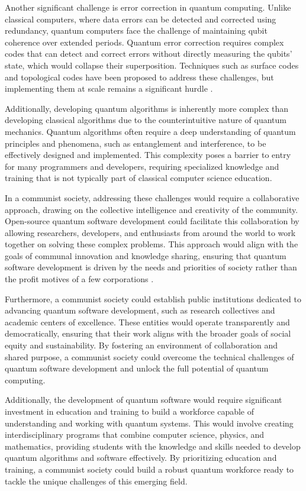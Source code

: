 Another significant challenge is error correction in quantum computing. Unlike classical computers, where data errors can be detected and corrected using redundancy, quantum computers face the challenge of maintaining qubit coherence over extended periods. Quantum error correction requires complex codes that can detect and correct errors without directly measuring the qubits' state, which would collapse their superposition. Techniques such as surface codes and topological codes have been proposed to address these challenges, but implementing them at scale remains a significant hurdle \cite[pp.~032324]{Fowler2012}.

Additionally, developing quantum algorithms is inherently more complex than developing classical algorithms due to the counterintuitive nature of quantum mechanics. Quantum algorithms often require a deep understanding of quantum principles and phenomena, such as entanglement and interference, to be effectively designed and implemented. This complexity poses a barrier to entry for many programmers and developers, requiring specialized knowledge and training that is not typically part of classical computer science education.

In a communist society, addressing these challenges would require a collaborative approach, drawing on the collective intelligence and creativity of the community. Open-source quantum software development could facilitate this collaboration by allowing researchers, developers, and enthusiasts from around the world to work together on solving these complex problems. This approach would align with the goals of communal innovation and knowledge sharing, ensuring that quantum software development is driven by the needs and priorities of society rather than the profit motives of a few corporations \cite[pp.~112-116]{QuantumSoftwareChallenges2022}.

Furthermore, a communist society could establish public institutions dedicated to advancing quantum software development, such as research collectives and academic centers of excellence. These entities would operate transparently and democratically, ensuring that their work aligns with the broader goals of social equity and sustainability. By fostering an environment of collaboration and shared purpose, a communist society could overcome the technical challenges of quantum software development and unlock the full potential of quantum computing.

Additionally, the development of quantum software would require significant investment in education and training to build a workforce capable of understanding and working with quantum systems. This would involve creating interdisciplinary programs that combine computer science, physics, and mathematics, providing students with the knowledge and skills needed to develop quantum algorithms and software effectively. By prioritizing education and training, a communist society could build a robust quantum workforce ready to tackle the unique challenges of this emerging field.

